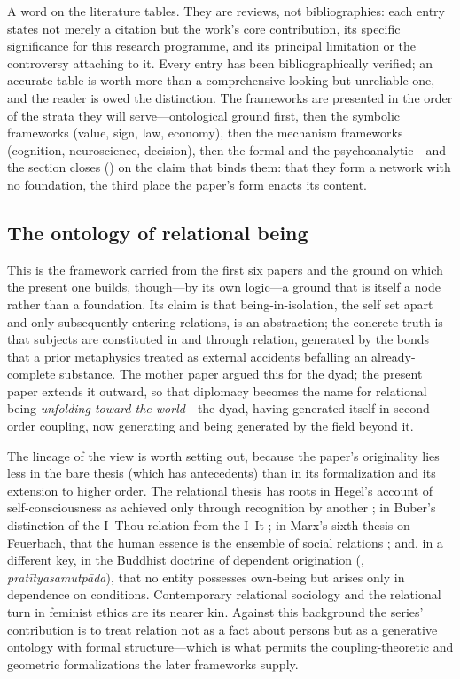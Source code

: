 A word on the literature tables. They are reviews, not bibliographies: each entry states not merely a citation but the work's core contribution, its specific significance for this research programme, and its principal limitation or the controversy attaching to it. Every entry has been bibliographically verified; an accurate table is worth more than a comprehensive-looking but unreliable one, and the reader is owed the distinction. The frameworks are presented in the order of the strata they will serve---ontological ground first, then the symbolic frameworks (value, sign, law, economy), then the mechanism frameworks (cognition, neuroscience, decision), then the formal and the psychoanalytic---and the section closes () on the claim that binds them: that they form a network with no foundation, the third place the paper's form enacts its content.

\subsection{The ontology of relational being}
This is the framework carried from the first six papers and the ground on which the present one builds, though---by its own logic---a ground that is itself a node rather than a foundation. Its claim is that being-in-isolation, the self set apart and only subsequently entering relations, is an abstraction; the concrete truth is that subjects are constituted in and through relation, generated by the bonds that a prior metaphysics treated as external accidents befalling an already-complete substance. The mother paper argued this for the dyad; the present paper extends it outward, so that diplomacy becomes the name for relational being \emph{unfolding toward the world}---the dyad, having generated itself in second-order coupling, now generating and being generated by the field beyond it.

The lineage of the view is worth setting out, because the paper's originality lies less in the bare thesis (which has antecedents) than in its formalization and its extension to higher order. The relational thesis has roots in Hegel's account of self-consciousness as achieved only through recognition by another \parencite{hegel1807}; in Buber's distinction of the I--Thou relation from the I--It \parencite{buber1923}; in Marx's sixth thesis on Feuerbach, that the human essence is the ensemble of social relations \parencite{marx1845theses}; and, in a different key, in the Buddhist doctrine of dependent origination (, \emph{pratītyasamutpāda}), that no entity possesses own-being but arises only in dependence on conditions. Contemporary relational sociology \parencite{emirbayer1997manifesto,emirbayer1998agency,crossley2011towards,donati2011relational} and the relational turn in feminist ethics \parencite{mackenzie2000relational} are its nearer kin. Against this background the series' contribution is to treat relation not as a fact about persons but as a generative ontology with formal structure---which is what permits the coupling-theoretic and geometric formalizations the later frameworks supply.

